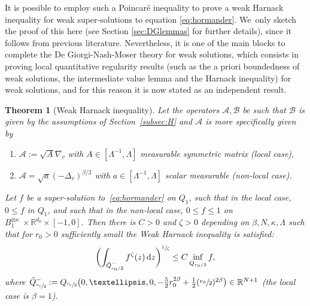 \documentclass[10pt]{amsart}
\newenvironment{enumeratei}
{\bgroup\def\theenumi{\roman{enumi}}\def\theenumii{\arabic{enumii}}\begin{enumerate}}
{\end{enumerate}\egroup}
\newtheorem{theorem}{Theorem}
\theoremstyle{definition}
\newcommand\R{{\mathbb R}}
\newcommand{\cA}{{\mathcal A}}
\newcommand{\cB}{{\mathcal B}}
\newcommand{\dd}{{\, \mathrm d}}
\begin{document}
It is possible to employ such a Poincaré inequality to prove a weak Harnack inequality
for weak super-solutions to equation \eqref{eq:hormander}. We~only sketch the proof of this here (see Section \ref{sec:DGlemmas} for further details), since it follows from previous literature. Nevertheless,
it is one of the main blocks to complete the De Giorgi-Nash-Moser theory for weak solutions, which
consists in proving local quantitative regularity results (such as the a priori boundedness of weak solutions, the intermediate value lemma and
the Harnack inequality) for weak solutions, and for this reason it is now stated as an independent result.
\begin{theorem}[Weak Harnack inequality]
\label{thm:weak_harnack_nonlocal}
Let the operators $\cA, \cB$ be such that $\cB$ is given by
the assumptions of Section~\ref{subsec:H} and $\cA$ is more specifically given by
\begin{enumeratei}
\item
$\cA:=\sqrt{A} \nabla_{v}$ with
$A \in [\Lambda^{-1},\Lambda]$ measurable symmetric matrix (local
case),
\item
$\cA = \sqrt{a} (-\Delta_v)^{\beta/2}$ with
$a \in [\Lambda^{-1},\Lambda]$ scalar measurable (non-local
case).
\end{enumeratei}
Let $f$ be a super-solution to~\eqref{eq:hormander} on $Q_1$, such that in the local case, $0 \leq f $ in $Q_1$, and such that in the non-local case,
$0 \le f \le 1$ on $B_1^{\otimes \kappa} \ \times \R^{d_0} \times [-1, 0]$. Then there is $C > 0$
and $\zeta > 0$ depending on $\beta, N, \kappa, \Lambda$ such
that for $r_0 > 0$ sufficiently small the Weak Harnack
inequality is satisfied:\vspace*{-3pt}
\begin{equation}
\biggl(\int_{\tilde Q^-_{r_0/2}} f^\zeta(z) \dd
z\biggr)^{\sfrac{1}{\zeta}} \leq C \inf_{Q_{r_0/2}} f,
\end{equation}
where
$\tilde Q_{\sfrac{r_0}{2}}^- := Q_{\sfrac{r_0}{2}}\big(0, \dots,
0, -\frac{5}{2} r_0^{2\beta} +\frac{1}{2}
(\sfrac{r_0}{2})^{2\beta}\big)\in \R^{N+1}$ (the local
case is $\beta=1$).
\end{theorem}
\end{document}
